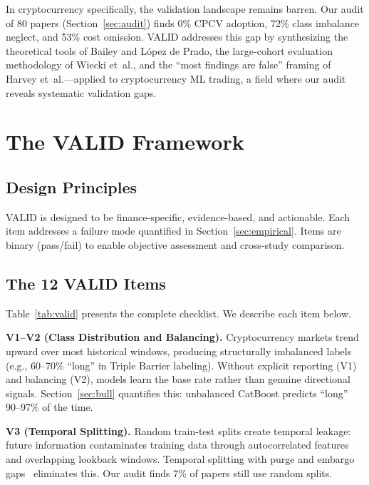 \documentclass[sigconf,anonymous,review]{acmart}
\begin{document}
In cryptocurrency specifically, the validation landscape remains
barren. Our audit of 80 papers (Section~\ref{sec:audit}) finds 0\%
CPCV adoption, 72\% class imbalance neglect, and 53\% cost omission.
VALID addresses this gap by synthesizing the theoretical tools of
Bailey and L\'{o}pez de Prado, the large-cohort evaluation methodology
of Wiecki et~al., and the ``most findings are false'' framing of
Harvey et~al.---applied to cryptocurrency ML trading, a field where our audit
reveals systematic validation gaps.


\section{The VALID Framework}
\label{sec:valid}

\subsection{Design Principles}

VALID is designed to be finance-specific, evidence-based, and
actionable. Each item addresses a failure mode quantified in
Section~\ref{sec:empirical}. Items are binary (pass/fail) to enable
objective assessment and cross-study comparison.

\subsection{The 12 VALID Items}

Table~\ref{tab:valid} presents the complete checklist. We describe
each item below.

\textbf{V1--V2 (Class Distribution and Balancing).}
Cryptocurrency markets trend upward over most historical windows,
producing structurally imbalanced labels (e.g., 60--70\% ``long'' in
Triple Barrier labeling). Without explicit reporting (V1) and
balancing (V2), models learn the base rate rather than genuine
directional signals. Section~\ref{sec:bull} quantifies this: unbalanced
CatBoost predicts ``long'' 90--97\% of the time.

\textbf{V3 (Temporal Splitting).}
Random train-test splits create temporal leakage: future information
contaminates training data through autocorrelated features and
overlapping lookback windows. Temporal splitting with purge and
embargo gaps~\cite{lopezdeprado2018advances} eliminates this.
Our audit finds 7\% of papers still use random splits.
\end{document}
